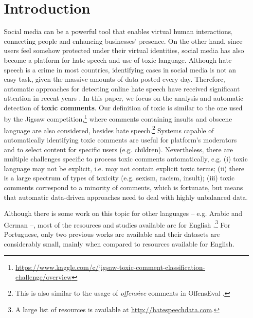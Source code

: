 \documentclass[11pt,a4paper]{article}
\begin{document}
\section{Introduction}
Social media can be a powerful tool that enables virtual human interactions, connecting people and enhancing businesses' presence. On the other hand, since users feel somehow protected under their virtual identities, social media has also become a platform for hate speech and use of toxic language. Although hate speech is a crime in most countries, identifying cases in social media is not an easy task, given the massive amounts of data posted every day. Therefore, automatic approaches for detecting online hate speech have received significant attention in recent years \cite{waseem-hovy-2016-hateful,davidson-etal-2017,zampieri-etal-2019-semeval}.
In this paper, we focus on the analysis and automatic detection of \textbf{toxic comments}. Our definition of toxic is similar to the one used by the Jigsaw competition,\footnote{\url{https://www.kaggle.com/c/jigsaw-toxic-comment-classification-challenge/overview}} where comments containing insults and obscene language are also considered, besides hate speech.\footnote{This is also similar to the usage of \textit{offensive} comments in OffensEval \cite{zampieri-etal-2019-semeval,zampieri-etal-2020-semeval}.} Systems capable of automatically identifying toxic comments are useful for platform's moderators and to select content for specific users (e.g. children).
Nevertheless, there are multiple challenges specific to process toxic comments automatically, e.g. (i) toxic language may not be explicit, i.e. may not contain explicit toxic terms; (ii) there is a large spectrum of types of toxicity (e.g. sexism, racism, insult); (iii) toxic comments correspond to a minority of comments, which is fortunate, but means that automatic data-driven approaches need to deal with highly unbalanced data. 

Although there is some work on this topic for other languages -- e.g. Arabic \cite{mubarak-etal-2017-abusive} and German \cite{wiegand-etal-2018-germeval} --, most of the resources and studies available are for English \cite{davidson-etal-2017,wulzyn-etal-2017,founta-etal-2018,mandl-etal-2019,zampieri-etal-2019-semeval}.\footnote{A large list of resources is available at \url{http://hatespeechdata.com}.} 
For Portuguese, only two previous works are available \cite{fortuna-etal-2019-hierarchically,depelle-2017} and their datasets are considerably small, mainly when compared to resources available for English. 
\end{document}
